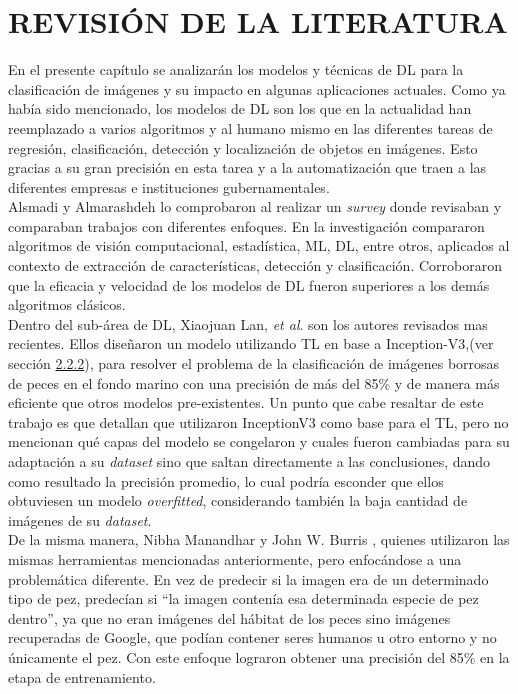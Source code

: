\chapter{REVISI\'ON DE LA LITERATURA}

En el presente capítulo se analizarán los modelos y técnicas de DL 
para la clasificación de imágenes y su impacto en algunas aplicaciones 
actuales. Como ya había sido mencionado, los modelos de DL son los que 
en la actualidad han reemplazado a varios algoritmos y al humano mismo 
en las diferentes tareas de regresión, clasificación, detección y 
localización de objetos en imágenes. Esto gracias a su gran precisión 
en esta tarea y a la automatización que traen a las diferentes empresas 
e instituciones gubernamentales. \\

Alsmadi y Almarashdeh \cite{Alsmadi2022} lo comprobaron al realizar un 
\textit{survey} donde revisaban y comparaban trabajos con diferentes 
enfoques. En la investigación compararon algoritmos de visión 
computacional, estadística, ML, DL, entre otros, aplicados al contexto de 
extracción de características, detección y clasificación. Corroboraron 
que la eficacia y velocidad de los modelos de DL fueron superiores 
a los demás algoritmos clásicos.\\

Dentro del sub-área de DL, Xiaojuan Lan, \textit{et al}.\cite{10.1145/3419635.3419643} 
son los autores revisados mas recientes. Ellos diseñaron un modelo utilizando TL en 
base a Inception-V3,(ver sección \hyperref[sec:inceptionV3]{2.2.2}), para resolver el 
problema de la clasificación de imágenes borrosas de peces en el fondo marino con una 
precisión de más del 85\% y de manera más eficiente que otros modelos pre-existentes. 
Un punto que cabe resaltar de este trabajo es que detallan que utilizaron 
InceptionV3 como base para el TL, pero no mencionan qué capas del modelo se congelaron y 
cuales fueron cambiadas para su adaptación a su \textit{dataset} sino que saltan directamente 
a las conclusiones, dando como resultado la precisión promedio, lo cual podría esconder 
que ellos obtuviesen un modelo \textit{overfitted}, considerando también la baja cantidad 
de imágenes de su \textit{dataset}. \\

De la misma manera, Nibha Manandhar y John W. Burris \cite{10.1145/3325917.3325934}, 
quienes utilizaron las mismas herramientas mencionadas anteriormente, pero enfocándose a 
una problemática diferente. En vez de predecir si la imagen era de un determinado tipo de 
pez, predecían si ``la imagen contenía esa determinada especie de pez dentro'', ya 
que no eran imágenes del hábitat de los peces sino imágenes recuperadas de Google, que 
podían contener seres humanos u otro entorno y no únicamente el pez. Con este enfoque lograron 
obtener una precisión del 85\% en la etapa de entrenamiento. \\


